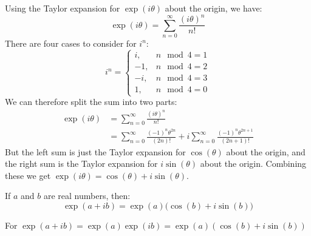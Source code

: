             \begin{bproof}
                Using the Taylor expansion for $\exp(i\theta)$
                about the origin, we have:
                \begin{equation*}
                    \exp(i\theta)
                    =\sum_{n=0}^{\infty}\frac{(i\theta)^{n}}{n!}
                \end{equation*}
                There are four cases to consider for $i^{n}$:
                \begin{equation*}
                    i^{n}=
                    \begin{cases}
                        i,&n\mod{4}=1\\
                        -1,&n\mod{4}=2\\
                        -i,&n\mod{4}=3\\
                        1,&n\mod{4}=0
                    \end{cases}
                \end{equation*}
                We can therefore split the sum into two parts:
                \begin{align*}
                    \exp(i\theta)
                    &=\sum_{n=0}^{\infty}\frac{(i\theta)^{n}}{n!}\\
                    &=\sum_{n=0}^{\infty}
                    \frac{(-1)^{n}\theta^{2n}}{(2n)!}+
                    i\sum_{n=0}^{\infty}
                    \frac{(-1)^{n}\theta^{2n+1}}{(2n+1)!}
                \end{align*}
                But the left sum is just the Taylor expansion
                for $\cos(\theta)$ about the origin, and the
                right sum is the Taylor expansion for
                $i\sin(\theta)$ about the origin. Combining these
                we get
                $\exp(i\theta)=\cos(\theta)+i\sin(\theta)$.
            \end{bproof}
            \begin{fcorollary}{}{}
                If $a$ and $b$ are real numbers, then:
                \begin{equation*}
                    \exp(a+ib)=\exp(a)\big(\cos(b)+i\sin(b)\big)
                \end{equation*}
            \end{fcorollary}
            \begin{bproof}
                For
                $\exp(a+ib)=\exp(a)\exp(ib)%
                 =\exp(a)(\cos(b)+i\sin(b))$
            \end{bproof}
